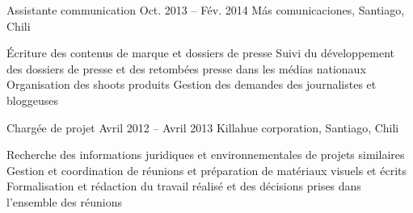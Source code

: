 \begin{joblist}
{		%
	}



\item[Assistante communication]{Oct. 2013 -- Fév. 2014 }     
  	{Más comunicaciones, Santiago, Chili}     
  	{

		\iftbftiny \setlength{\parskip}{-10pt} \fi
		\begin{itemize}
			  \iftbftiny \setlength\itemsep{-3pt} \fi
			  \cvitem[\checkmark]  Écriture des contenus de marque et dossiers de presse                                        
			  \cvitem[\checkmark]  Suivi du développement des dossiers de presse et des retombées presse dans les médias nationaux                                             
			  \cvitem[\checkmark]  Organisation des shoots produits 
			  \cvitem[\checkmark]  Gestion des demandes des journalistes et bloggeuses 

		\end{itemize}       
	}




\item[Chargée de projet]{Avril 2012 -- Avril 2013 }     
	{Killahue corporation, Santiago, Chili}     
	{
			 
		\iftbftiny \setlength{\parskip}{-10pt} \fi
		\begin{itemize}
			  \iftbftiny \setlength\itemsep{-3pt} \fi
			  \cvitem[\checkmark] Recherche des informations juridiques et environnementales de projets similaires          
			  \cvitem[\checkmark] Gestion et coordination de réunions et préparation de matériaux visuels et écrits   
			  \cvitem[\checkmark] Formalisation et rédaction du travail réalisé et des décisions prises dans l’ensemble des réunions     
		\end{itemize}      

}
\end{joblist}
